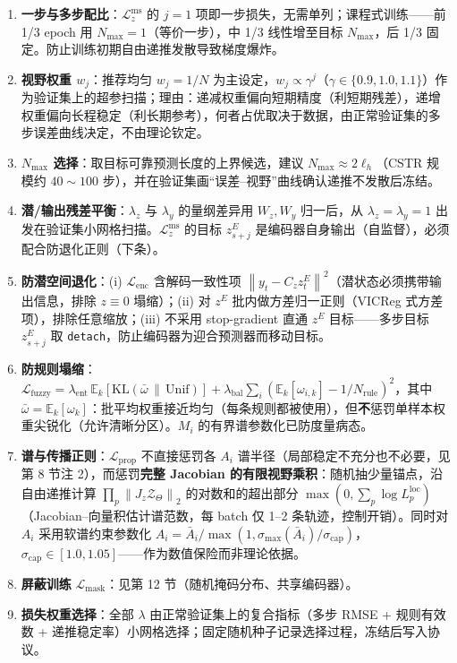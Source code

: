 \documentclass[11pt,a4paper]{ctexart}
\theoremstyle{remark}
\newcommand{\E}{\mathbb{E}}
\newcommand{\norm}[1]{\left\|#1\right\|}
\newcommand{\ZT}{\mathcal{Z}_{\Theta}}
\begin{document}
\begin{enumerate}
\item \textbf{一步与多步配比}：$\mathcal L^{\mathrm{ms}}_z$ 的 $j=1$ 项即一步损失，无需单列；课程式训练——前 1/3 epoch 用 $N_{\max}=1$（等价一步），中 1/3 线性增至目标 $N_{\max}$，后 1/3 固定。防止训练初期自由递推发散导致梯度爆炸。
\item \textbf{视野权重 $w_j$}：推荐均匀 $w_j=1/N$ 为主设定，$w_j\propto\gamma^j$（$\gamma\in\{0.9,1.0,1.1\}$）作为验证集上的超参扫描；理由：递减权重偏向短期精度（利短期残差），递增权重偏向长程稳定（利长期参考），何者占优取决于数据，由正常验证集的多步误差曲线决定，不由理论钦定。
\item \textbf{$N_{\max}$ 选择}：取目标可靠预测长度的上界候选，建议 $N_{\max}\approx2\ell_h$（CSTR 规模约 $40\sim100$ 步），并在验证集画“误差--视野”曲线确认递推不发散后冻结。
\item \textbf{潜/输出残差平衡}：$\lambda_z$ 与 $\lambda_y$ 的量纲差异用 $W_z,W_y$ 归一后，从 $\lambda_z=\lambda_y=1$ 出发在验证集小网格扫描。$\mathcal L^{\mathrm{ms}}_z$ 的目标 $z^E_{s+j}$ 是编码器自身输出（自监督），必须配合防退化正则（下条）。
\item \textbf{防潜空间退化}：(i) $\mathcal L_{\mathrm{enc}}$ 含解码一致性项 $\norm{y_t-C_zz^E_t}^2$（潜状态必须携带输出信息，排除 $z\equiv0$ 塌缩）；(ii) 对 $z^E$ 批内做方差归一正则（VICReg 式方差项），排除任意缩放；(iii) 不采用 stop-gradient 直通 $z^E$ 目标——多步目标 $z^E_{s+j}$ 取 \texttt{detach}，防止编码器为迎合预测器而移动目标。
\item \textbf{防规则塌缩}：$\mathcal L_{\mathrm{fuzzy}}=\lambda_{\mathrm{ent}}\,\E_k[\mathrm{KL}(\bar\omega\,\|\,\mathrm{Unif})]+\lambda_{\mathrm{bal}}\sum_i(\E_k[\omega_{i,k}]-1/N_{\mathrm{rule}})^2$，其中 $\bar\omega=\E_k[\omega_k]$：批平均权重接近均匀（每条规则都被使用），但\textbf{不}惩罚单样本权重尖锐化（允许清晰分区）。$M_i$ 的有界谱参数化已防度量病态。
\item \textbf{谱与传播正则}：$\mathcal L_{\mathrm{prop}}$ 不直接惩罚各 $A_i$ 谱半径（局部稳定不充分也不必要，见第 8 节注 2），而惩罚\textbf{完整 Jacobian 的有限视野乘积}：随机抽少量锚点，沿自由递推计算 $\prod_{p}\norm{J_z\ZT}_2$ 的对数和的超出部分 $\max(0,\sum_p\log L_p^{\mathrm{loc}})$（Jacobian--向量积估计谱范数，每 batch 仅 1--2 条轨迹，控制开销）。同时对 $A_i$ 采用软谱约束参数化 $A_i=\bar A_i/\max(1,\sigma_{\max}(\bar A_i)/\sigma_{\mathrm{cap}})$，$\sigma_{\mathrm{cap}}\in[1.0,1.05]$——作为数值保险而非理论依据。
\item \textbf{屏蔽训练} $\mathcal L_{\mathrm{mask}}$：见第 12 节（随机掩码分布、共享编码器）。
\item \textbf{损失权重选择}：全部 $\lambda$ 由正常验证集上的复合指标（多步 RMSE + 规则有效数 + 递推稳定率）小网格选择；固定随机种子记录选择过程，冻结后写入协议。
\end{enumerate}
\end{document}
